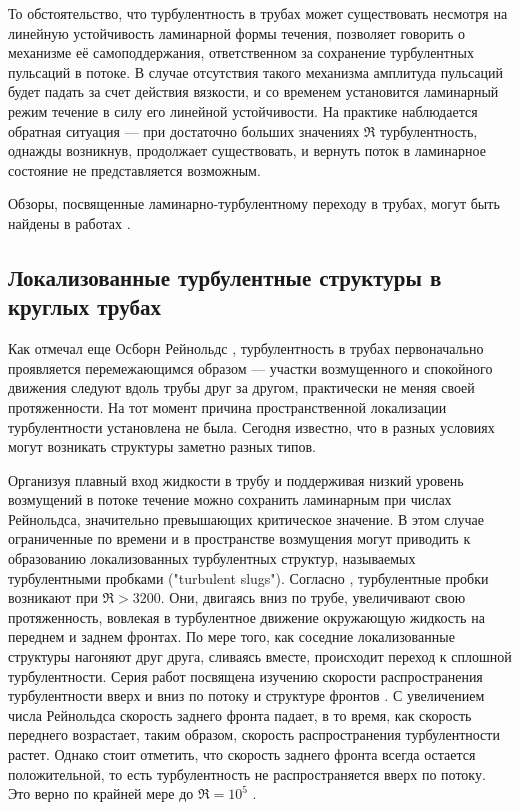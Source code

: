 То обстоятельство, что турбулентность в трубах может существовать несмотря на линейную устойчивость ламинарной формы течения, позволяет говорить о механизме её самоподдержания, ответственном за сохранение турбулентных пульсаций в потоке. В случае отсутствия такого механизма амплитуда пульсаций будет падать за счет действия вязкости, и со временем установится ламинарный режим течение в силу его линейной устойчивости. На практике наблюдается обратная ситуация --- при достаточно больших значениях $\Re$ турбулентность, однажды возникнув, продолжает существовать, и вернуть поток в ламинарное состояние не представляется возможным. 

Обзоры, посвященные ламинарно-турбулентному переходу в трубах, могут быть найдены в работах \cite{Kerswell2005, Eckhardt2007, Manneville2015, Manneville2016, Kreilos2014, Barkley2016}.



	\subsection{Локализованные турбулентные структуры в круглых трубах} \label{local_structures}

Как отмечал еще Осборн Рейнольдс \cite{Reynolds1883}, турбулентность в трубах первоначально проявляется перемежающимся образом --- участки возмущенного и спокойного движения следуют вдоль трубы друг за другом, практически не меняя своей протяженности. На тот момент причина пространственной локализации турбулентности установлена не была. Сегодня известно, что в разных условиях могут возникать структуры заметно разных типов. 

Организуя плавный вход жидкости в трубу и поддерживая низкий уровень возмущений в потоке течение можно сохранить ламинарным при числах Рейнольдса, значительно превышающих критическое значение. В этом случае ограниченные по времени и в пространстве возмущения могут приводить к образованию локализованных турбулентных структур, называемых турбулентными пробками ("turbulent slugs"). Согласно \cite{Wygnanski1973}, турбулентные пробки возникают при $\Re > 3200$. Они, двигаясь вниз по трубе, увеличивают свою протяженность, вовлекая в турбулентное движение окружающую жидкость на переднем и заднем фронтах. По мере того, как соседние локализованные структуры нагоняют друг друга, сливаясь вместе, происходит переход к сплошной турбулентности. Серия работ посвящена изучению скорости распространения турбулентности вверх и вниз по потоку и структуре фронтов \cite{Lindgren1969, Wygnanski1973, Nishi2008, Duguet2010, Barkley2015}. С увеличением числа Рейнольдса скорость заднего фронта падает, в то время, как скорость переднего возрастает, таким образом, скорость распространения турбулентности растет. Однако стоит отметить, что скорость заднего фронта всегда остается положительной, то есть турбулентность не распространяется вверх по потоку. Это верно по крайней мере до $\Re = 10^5$ \cite{Wygnanski1973}. 

